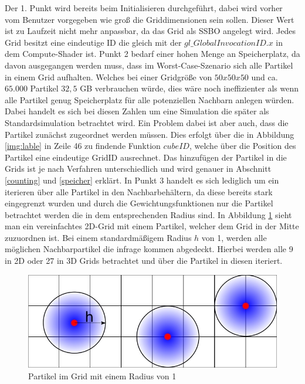 \documentclass[intern,palatino]{cgBA}
\begin{document}
Der 1. Punkt wird bereits beim Initialisieren durchgeführt, dabei wird vorher vom Benutzer vorgegeben wie groß die Griddimensionen sein sollen. Dieser Wert ist zu Laufzeit nicht mehr anpassbar, da das Grid als SSBO angelegt wird. Jedes Grid besitzt eine eindeutige ID die gleich mit der $gl\_GlobalInvocationID.x$ in dem Compute-Shader ist. 
\newline
Punkt 2 bedarf einer hohen Menge an Speicherplatz, da davon ausgegangen werden muss, dass im Worst-Case-Szenario sich alle Partikel in einem Grid aufhalten. Welches bei einer Gridgröße von $50x50x50$ und ca. $65.000$ Partikel $32,5$ GB verbrauchen würde, dies wäre noch ineffizienter als wenn alle Partikel genug Speicherplatz für alle potenziellen Nachbarn anlegen würden. Dabei handelt es sich bei diesen Zahlen um eine Simulation die später als Standardsimulation betrachtet wird.
\newline
Ein Problem dabei ist aber auch, dass die Partikel zunächst zugeordnet werden müssen. Dies erfolgt über die in Abbildung \ref{img:lable} in Zeile 46 zu findende Funktion $cubeID$, welche über die Position des Partikel eine eindeutige GridID ausrechnet. Das hinzufügen der Partikel in die Grids ist je nach Verfahren unterschiedlich und wird genauer in Abschnitt \ref{counting} und \ref{speicher}  erklärt.
\newline
In Punkt 3 handelt es sich lediglich um ein iterieren über alle Partikel in den Nachbarbehältern, da diese bereits stark eingegrenzt wurden und durch die Gewichtungsfunktionen nur die Partikel betrachtet werden die in dem entsprechenden Radius sind.
\newline
In Abbildung \ref{img:grid} sieht man ein vereinfachtes 2D-Grid mit einem Partikel, welcher dem Grid in der Mitte zuzuordnen ist. Bei einem standardmäßigem Radius $h$ von 1, werden alle möglichen Nachbarpartikel die infrage kommen abgedeckt. Hierbei werden alle 9 in 2D oder 27 in 3D Grids betrachtet und über die Partikel in diesen iteriert.

\begin{figure}[H]
	\centering
	\includegraphics[width=1\columnwidth]{Bilder/grid.jpg}
	\caption{Partikel im Grid mit einem Radius von 1}
	\label{img:grid}
\end{figure}
\end{document}
